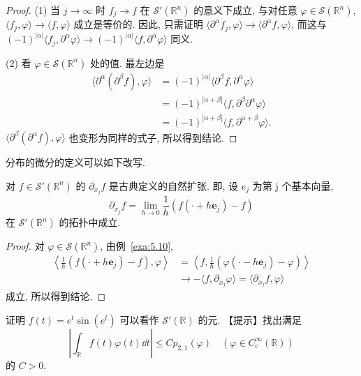 \begin{proof}
(1) 当 $j \to \infty$ 时 $f_{j} \to f$ 在 $\mathcal{S}'(\mathbb{R}^{n})$ 的意义下成立, 与对任意 $\varphi \in \mathcal{S}(\mathbb{R}^{n})$, $\langle f_{j}, \varphi\rangle \to \langle f, \varphi\rangle$ 成立是等价的. 因此, 只需证明 $\langle\partial^{\alpha}f_{j}, \varphi\rangle \to \langle\partial^{\alpha}f, \varphi\rangle$, 而这与 $(-1)^{|\alpha|}\langle f_{j}, \partial^{\alpha}\varphi\rangle \to (-1)^{|\alpha|}\langle f, \partial^{\alpha}\varphi\rangle$ 同义.

(2) 看 $\varphi \in \mathcal{S}(\mathbb{R}^{n})$ 处的值. 最左边是
\begin{align*}
\langle\partial^{\alpha}(\partial^{\beta}f), \varphi\rangle &= (-1)^{|\alpha|}\langle\partial^{\beta}f, \partial^{\alpha}\varphi\rangle \\
&= (-1)^{|\alpha+\beta|}\langle f, \partial^{\beta}\partial^{\alpha}\varphi\rangle \\
&= (-1)^{|\alpha+\beta|}\langle f, \partial^{\alpha+\beta}\varphi\rangle.
\end{align*}
$\langle\partial^{\beta}(\partial^{\alpha}f), \varphi\rangle$ 也变形为同样的式子, 所以得到结论.
\end{proof}

分布的微分的定义可以如下改写.

\begin{theorem}\label{thm:5.11}
对 $f \in \mathcal{S}'(\mathbb{R}^{n})$ 的 $\partial_{x_{j}}f$ 是古典定义的自然扩张. 即, 设 $e_{j}$ 为第 j 个基本向量,
\[
\partial_{x_{j}}f = \lim_{h \to 0}\frac{1}{h}(f(\cdot + h\mathbf{e}_{j}) - f)
\]
在 $\mathcal{S}'(\mathbb{R}^{n})$ 的拓扑中成立.
\end{theorem}

\begin{proof}
对 $\varphi \in \mathcal{S}(\mathbb{R}^{n})$, 由例~\ref{exa:5.10},
\begin{align*}
\left\langle\frac{1}{h}(f(\cdot + h\mathbf{e}_{j}) - f), \varphi\right\rangle &= \left\langle f, \frac{1}{h}(\varphi(\cdot - h\mathbf{e}_{j}) - \varphi)\right\rangle \\
&\to -\langle f, \partial_{x_{j}}\varphi\rangle = \langle\partial_{x_{j}}f, \varphi\rangle
\end{align*}
成立, 所以得到结论.
\end{proof}

\begin{exercise}\label{exer:5.11}
证明 $f(t) = e^{t}\sin(e^{t})$ 可以看作 $\mathcal{S}'(\mathbb{R})$ 的元. 【提示】找出满足
\[
\left|\int_{\mathbb{R}}f(t)\varphi(t)\dd t\right| \leq Cp_{2,1}(\varphi) \quad (\varphi \in C_{\mathrm{c}}^{\infty}(\mathbb{R}))
\]
的 $C > 0$.
\end{exercise}
